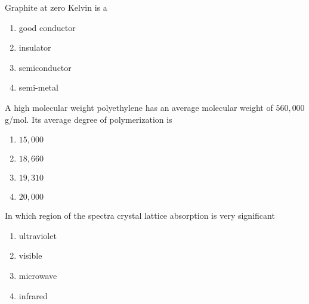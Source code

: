 \item Graphite at zero Kelvin is a

\begin{enumerate}
	\item good conductor
	\item insulator
	\item semiconductor
	\item semi-metal
\end{enumerate}

\item A high molecular weight polyethylene has an average molecular weight of $560,000$g/mol. Its average degree of polymerization is

\begin{enumerate}
	\item $15,000$
	\item $18,660$
	\item $19,310$
	\item $20,000$
\end{enumerate}

\item In which region of the spectra crystal lattice absorption is very significant

\begin{enumerate}
	\item ultraviolet
	\item visible
	\item microwave
	\item infrared
\end{enumerate}

